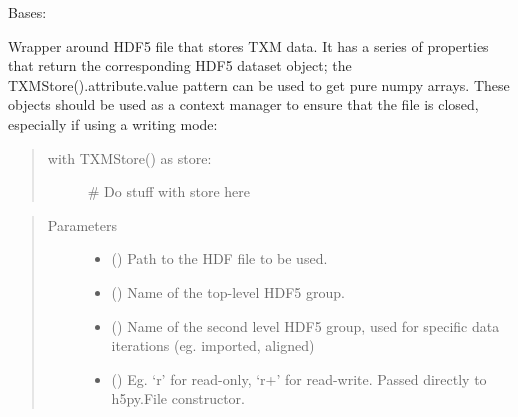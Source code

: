\documentclass[letterpaper,10pt,english]{sphinxmanual}
\begin{document}
\begin{fulllineitems}
\label{\detokenize{xanespy:xanespy.txmstore.TXMStore}}
Bases: 

Wrapper around HDF5 file that stores TXM data. It has a series of
properties that return the corresponding HDF5 dataset object; the
TXMStore().attribute.value pattern can be used to get pure numpy
arrays. These objects should be used as a context manager to ensure
that the file is closed, especially if using a writing mode:
\begin{quote}
\begin{description}
\item[{with TXMStore() as store:}] \leavevmode
\# Do stuff with store here

\end{description}
\end{quote}
\begin{quote}\begin{description}
\item[{Parameters}] \leavevmode\begin{itemize}
\item {} 
 () \textendash{} Path to the HDF file to be used.

\item {} 
 () \textendash{} Name of the top-level HDF5 group.

\item {} 
 () \textendash{} Name of the second level HDF5 group, used for specific data
iterations (eg. imported, aligned)

\item {} 
 () \textendash{} Eg. ‘r’ for read-only, ‘r+’ for read-write. Passed directly to
h5py.File constructor.

\end{itemize}

\end{description}\end{quote}

\begin{fulllineitems}
\label{\detokenize{xanespy:xanespy.txmstore.TXMStore.VERSION}}
\end{fulllineitems}


\end{fulllineitems}
\end{document}

